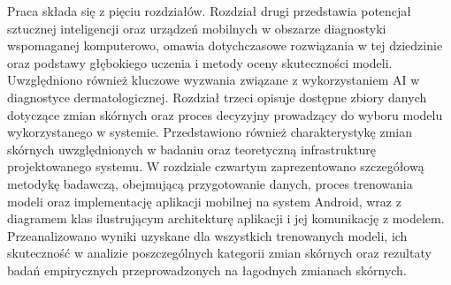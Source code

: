 Praca składa się z pięciu rozdziałów.
Rozdział drugi przedstawia potencjał sztucznej inteligencji oraz urządzeń mobilnych w obszarze diagnostyki wspomaganej komputerowo, omawia dotychczasowe rozwiązania w tej dziedzinie oraz podstawy głębokiego uczenia i metody oceny skuteczności modeli.
Uwzględniono również kluczowe wyzwania związane z wykorzystaniem AI w diagnostyce dermatologicznej.
Rozdział trzeci opisuje dostępne zbiory danych dotyczące zmian skórnych oraz proces decyzyjny prowadzący do wyboru modelu wykorzystanego w systemie.
Przedstawiono również charakterystykę zmian skórnych uwzględnionych w badaniu oraz teoretyczną infrastrukturę projektowanego systemu.
W rozdziale czwartym zaprezentowano szczegółową metodykę badawczą, obejmującą przygotowanie danych, proces trenowania modeli oraz implementację aplikacji mobilnej na system Android, wraz z diagramem klas ilustrującym architekturę aplikacji i jej komunikację z modelem.
Przeanalizowano wyniki uzyskane dla wszystkich trenowanych modeli, ich skuteczność w analizie poszczególnych kategorii zmian skórnych oraz rezultaty badań empirycznych przeprowadzonych na łagodnych zmianach skórnych.
